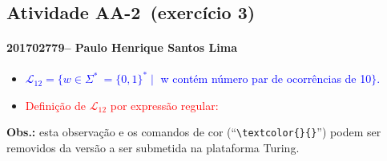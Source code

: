 \documentclass[12pt]{article}
\def\discente{Paulo Henrique Santos Lima}
\def\matricula{201702779}
\def\aa{2}
\def\exercicio{3}
\def\myling{12} %
\begin{document}
\subsection*{Atividade AA-\aa\ (exercício \exercicio)}
 \paragraph{\matricula -- \discente}
%
 \begin{itemize}
  \item \textcolor{blue}{$\mathcal{L}_\myling = \{w\in\Sigma^*\ = \{0,1\}^*\mid$  w contém número par de ocorrências de 10$\}$.}
%
  \item  \textcolor{red}{Definição de $\mathcal{L}_\myling$ por expressão regular:
%
  }
% 
 \end{itemize}
\noindent\textbf{Obs.:} esta observação e os comandos de cor (``\verb|\textcolor{}{}|'') podem ser removidos da versão a ser submetida na plataforma Turing.
\end{document}
